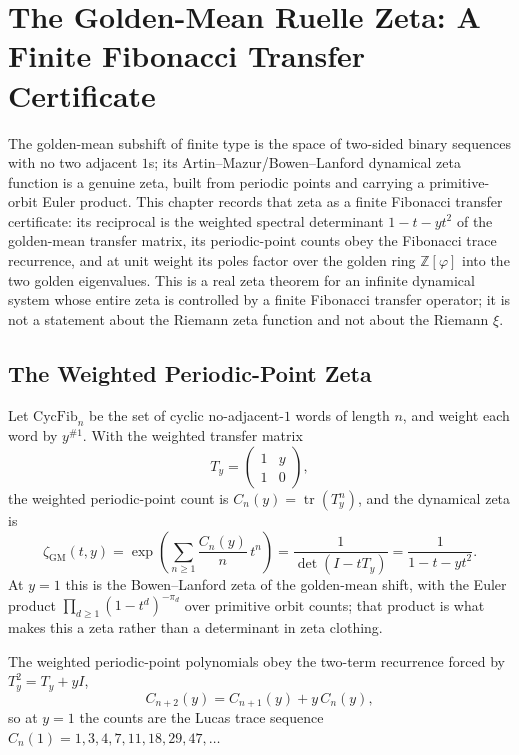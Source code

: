 \chapter{The Golden-Mean Ruelle Zeta: A Finite Fibonacci Transfer Certificate}
\label{ch:concrete-instances-window6-golden-mean-ruelle-zeta}

The golden-mean subshift of finite type is the space of two-sided binary sequences with no two adjacent $1$s; its Artin--Mazur/Bowen--Lanford dynamical zeta function is a genuine zeta, built from periodic points and carrying a primitive-orbit Euler product. This chapter records that zeta as a finite Fibonacci transfer certificate: its reciprocal is the weighted spectral determinant $1-t-yt^2$ of the golden-mean transfer matrix, its periodic-point counts obey the Fibonacci trace recurrence, and at unit weight its poles factor over the golden ring $\mathbb Z[\varphi]$ into the two golden eigenvalues. This is a real zeta theorem for an infinite dynamical system whose entire zeta is controlled by a finite Fibonacci transfer operator; it is not a statement about the Riemann zeta function and not about the Riemann $\xi$.

\section{The Weighted Periodic-Point Zeta}
\label{sec:window6-ruelle-zeta-object}

Let $\mathrm{CycFib}_n$ be the set of cyclic no-adjacent-$1$ words of length $n$, and weight each word by $y^{\#1}$. With the weighted transfer matrix
$$
T_y=\begin{pmatrix}1&y\\1&0\end{pmatrix},
$$
the weighted periodic-point count is $C_n(y)=\operatorname{tr}(T_y^n)$, and the dynamical zeta is
$$
\zeta_{\mathrm{GM}}(t,y)=\exp\!\left(\sum_{n\ge1}\frac{C_n(y)}{n}\,t^n\right)=\frac{1}{\det(I-tT_y)}=\frac{1}{1-t-yt^2}.
$$
At $y=1$ this is the Bowen--Lanford zeta of the golden-mean shift, with the Euler product $\prod_{d\ge1}(1-t^d)^{-\pi_d}$ over primitive orbit counts; that product is what makes this a zeta rather than a determinant in zeta clothing.

\begin{theorem}
\label{thm:window6-ruelle-trace-recurrence}
The weighted periodic-point polynomials obey the two-term recurrence forced by $T_y^2=T_y+yI$,
$$
C_{n+2}(y)=C_{n+1}(y)+y\,C_n(y),
$$
so at $y=1$ the counts are the Lucas trace sequence $C_n(1)=1,3,4,7,11,18,29,47,\ldots$
\end{theorem}

